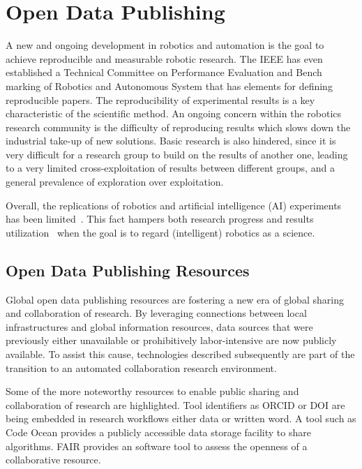\newpage
\section{Open Data Publishing}
\label{chapter3}
A new and ongoing development in robotics and automation is the goal to achieve reproducible and measurable robotic research. The IEEE has even established a Technical Committee on Performance Evaluation and Bench marking of Robotics and Autonomous System that has elements for defining reproducible papers. The reproducibility of experimental results is a key characteristic of the scientific method.  An ongoing concern within the robotics research community is the difficulty of reproducing results which slows down the industrial take-up of new solutions. Basic research is also hindered, since it is very difficult for a research group to build on the results of another one, leading to a very limited cross-exploitation of results between different groups, and a general prevalence of exploration over exploitation.

Overall, the replications of robotics and artificial intelligence (AI) experiments has been limited~\cite{bonsignorio2017new}. This fact hampers both research progress and results utilization~\cite{bonsignorio2014fostering, guglielmelli2015research} when the goal is to regard (intelligent) robotics as a science.

\subsection{Open Data Publishing Resources}

Global open data publishing resources are fostering a new era of global sharing and collaboration of research. By leveraging connections between local infrastructures and global information resources,  data sources that were previously either unavailable or prohibitively labor-intensive are now publicly available. To assist this cause, technologies described subsequently are part of the transition to an automated collaboration research environment. 

Some of the more noteworthy resources to enable public sharing and collaboration of research are highlighted. Tool identifiers as ORCID or DOI are being embedded in research workflows either data or written word. A tool such as Code Ocean provides a publicly accessible data storage facility to share algorithms. FAIR provides an software tool to assess the openness of a collaborative resource. 


